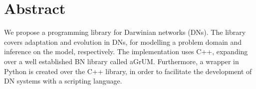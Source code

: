 %
\chapter*{Abstract}
\label{sec:abstract}
\vspace*{-10mm}

We propose a programming library for Darwinian networks (DNs).
The library covers adaptation and evolution in DNs, for modelling a problem domain and inference on the model, respectively.
The implementation uses C++, expanding over a well established BN library called aGrUM.
Furthermore, a wrapper in Python is created over the C++ library, in order to facilitate the development of DN systems with a scripting language.
